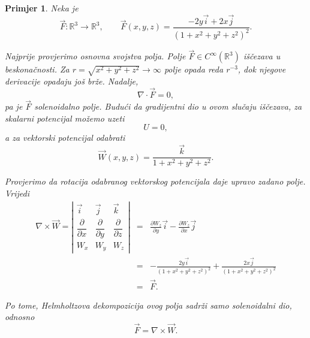 \documentclass[12pt,a4paper]{article}
\newtheorem{pr}[tm]{Primjer}
\begin{document}
\begin{pr}
Neka je
\[
\overrightarrow{F}:\mathbb{R}^3\to\mathbb{R}^3,
\qquad
\overrightarrow{F}(x,y,z)
=
\frac{-2y\overrightarrow{i}+2x\overrightarrow{j}}
{(1+x^2+y^2+z^2)^2}.
\]

Najprije provjerimo osnovna svojstva polja. Polje $\overrightarrow{F}\in C^\infty(\mathbb{R}^3)$ iščezava u beskonačnosti. Za
$r=\sqrt{x^2+y^2+z^2}\to\infty$ polje opada reda $r^{-3}$, dok njegove
derivacije opadaju još brže. Nadalje,
\[
\nabla\cdot\overrightarrow{F}=0,
\]
pa je $\overrightarrow{F}$ solenoidalno polje. Budući da gradijentni dio u ovom slučaju iščezava, za skalarni potencijal
možemo uzeti
\[
U=0,
\]
a za vektorski potencijal odabrati
\[
\overrightarrow{W}(x,y,z)
=
\frac{\overrightarrow{k}}
{1+x^2+y^2+z^2}.
\]

Provjerimo da rotacija odabranog vektorskog potencijala daje upravo zadano
polje. Vrijedi
\[
\begin{array}{lcl}
\nabla\times\overrightarrow{W}
=
\left|
\begin{array}{ccc}
\overrightarrow{i} & \overrightarrow{j} & \overrightarrow{k}\\
\dfrac{\partial}{\partial x} &
\dfrac{\partial}{\partial y} &
\dfrac{\partial}{\partial z}\\
W_x&W_y&W_z
\end{array}
\right|
&=&
\displaystyle
\frac{\partial W_z}{\partial y}\overrightarrow{i}
-\frac{\partial W_z}{\partial x}\overrightarrow{j}
\\[1em]
&=&
\displaystyle
-\frac{2y\overrightarrow{i}}
{(1+x^2+y^2+z^2)^2}
+
\frac{2x\overrightarrow{j}}
{(1+x^2+y^2+z^2)^2}
\\[1em]
&=&
\overrightarrow{F}.
\end{array}
\]

Po tome, Helmholtzova dekompozicija ovog polja sadrži samo solenoidalni
dio, odnosno
\[
\overrightarrow{F}
=
\nabla\times\overrightarrow{W}.
\]
\end{pr}
\end{document}
